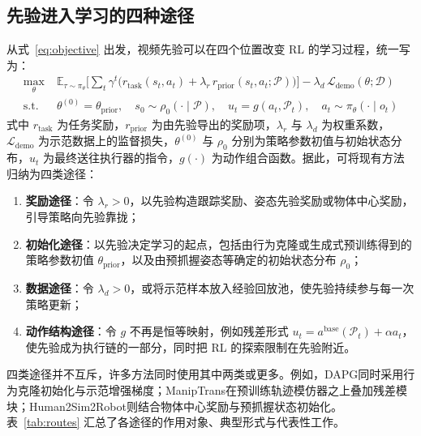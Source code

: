 \documentclass[UTF8,a4paper,zihao=-4]{ctexart}
\begin{document}
\subsection{先验进入学习的四种途径}

从式~\eqref{eq:objective} 出发，视频先验可以在四个位置改变 RL 的学习过程，统一写为：
\begin{equation}\label{eq:unified}
\begin{aligned}
  \max_{\theta}\;&\mathbb{E}_{\tau\sim\pi_{\theta}}\Big[\sum_{t}\gamma^{t}\big(r_{\mathrm{task}}(s_{t},a_{t})+\lambda_{r}\,r_{\mathrm{prior}}(s_{t},a_{t};\mathcal{P})\big)\Big]-\lambda_{d}\,\mathcal{L}_{\mathrm{demo}}(\theta;\mathcal{D})\\
  \mathrm{s.t.}\;&\theta^{(0)}=\theta_{\mathrm{prior}},\quad s_{0}\sim\rho_{0}(\cdot\mid\mathcal{P}),\quad u_{t}=g(a_{t},\mathcal{P}_{t}),\quad a_{t}\sim\pi_{\theta}(\cdot\mid o_{t})
\end{aligned}
\end{equation}
式中 $r_{\mathrm{task}}$ 为任务奖励，$r_{\mathrm{prior}}$ 为由先验导出的奖励项，$\lambda_r$ 与 $\lambda_d$ 为权重系数，$\mathcal{L}_{\mathrm{demo}}$ 为示范数据上的监督损失，$\theta^{(0)}$ 与 $\rho_0$ 分别为策略参数初值与初始状态分布，$u_t$ 为最终送往执行器的指令，$g(\cdot)$ 为动作组合函数。据此，可将现有方法归纳为四类途径：
\begin{enumerate}
  \item \textbf{奖励途径}：令 $\lambda_r>0$，以先验构造跟踪奖励、姿态先验奖励或物体中心奖励，引导策略向先验靠拢；
  \item \textbf{初始化途径}：以先验决定学习的起点，包括由行为克隆或生成式预训练得到的策略参数初值 $\theta_{\mathrm{prior}}$，以及由预抓握姿态等确定的初始状态分布 $\rho_0$；
  \item \textbf{数据途径}：令 $\lambda_d>0$，或将示范样本放入经验回放池，使先验持续参与每一次策略更新；
  \item \textbf{动作结构途径}：令 $g$ 不再是恒等映射，例如残差形式 $u_t=a^{\mathrm{base}}(\mathcal{P}_t)+\alpha a_t$，使先验成为执行链的一部分，同时把 RL 的探索限制在先验附近。
\end{enumerate}

四类途径并不互斥，许多方法同时使用其中两类或更多。例如，DAPG\cite{dapg}同时采用行为克隆初始化与示范增强梯度；ManipTrans\cite{maniptrans}在预训练轨迹模仿器之上叠加残差模块；Human2Sim2Robot\cite{human2sim2robot}则结合物体中心奖励与预抓握状态初始化。表~\ref{tab:routes} 汇总了各途径的作用对象、典型形式与代表性工作。
\end{document}
